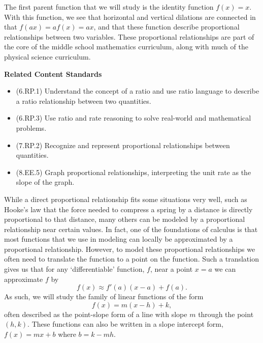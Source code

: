 \documentclass[
]{book}
\providecommand{\tightlist}{%
  \setlength{\itemsep}{0pt}\setlength{\parskip}{0pt}}
\newenvironment{standards}{}{}
\theoremstyle{definition}
\theoremstyle{definition}
\theoremstyle{definition}
\theoremstyle{definition}
\theoremstyle{remark}
\begin{document}
The first parent function that we will study is the identity function \(f(x)=x\). With this function, we see that horizontal and vertical dilations are connected in that \(f(ax)=a f(x) = ax\), and that these function describe proportional relationships between two variables. These proportional relationships are part of the core of the middle school mathematics curriculum, along with much of the physical science curriculum.

\begin{standards}

\begin{center}
\textbf{Related Content Standards}

\end{center}

\begin{itemize}
\tightlist
\item
  (6.RP.1) Understand the concept of a ratio and use ratio language to describe a ratio relationship between two quantities.
\item
  (6.RP.3) Use ratio and rate reasoning to solve real-world and mathematical problems.
\item
  (7.RP.2) Recognize and represent proportional relationships between quantities.
\item
  (8.EE.5) Graph proportional relationships, interpreting the unit rate as the slope of the graph.
\end{itemize}

\end{standards}

While a direct proportional relationship fits some situations very well, such as Hooke's law that the force needed to compress a spring by a distance is directly proportional to that distance, many others can be modeled by a proportional relationship near certain values. In fact, one of the foundations of calculus is that most functions that we use in modeling can locally be approximated by a proportional relationship. However, to model these proportional relationships we often need to translate the function to a point on the function. Such a translation gives us that for any `differentiable' function, \(f\), near a point \(x=a\) we can approximate \(f\) by \[f(x) \approx f'(a)(x-a) + f(a).\] As such, we will study the family of linear functions of the form
\[f(x)=m(x-h)+k,\] often described as the point-slope form of a line with slope \(m\) through the point \((h,k)\). These functions can also be written in a slope intercept form, \(f(x)=mx+b\) where \(b=k-mh\).
\end{document}
